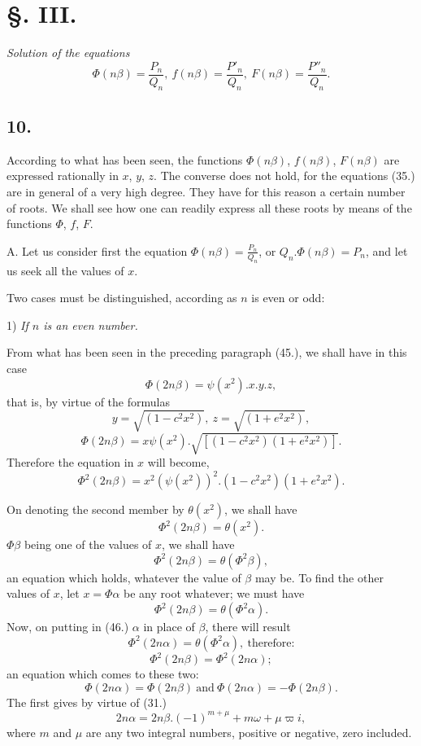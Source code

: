 \documentclass{article}
\begin{document}
\section*{§. III.}

\emph{Solution of the equations}
\[ \Phi(n\beta)=\frac{P_n}{Q_n},\ f(n\beta)=\frac{P'_n}{Q_n},\ F(n\beta)=\frac{P''_n}{Q_n}. \]

\subsection*{10.}

According to what has been seen, the functions $\Phi(n\beta)$, $f(n\beta)$, $F(n\beta)$ are expressed rationally in $x$, $y$, $z$. The converse does not hold, for the equations (35.) are in general of a very high degree. They have for this reason a certain number of roots. We shall see how one can readily express all these roots by means of the functions $\Phi$, $f$, $F$.

A. Let us consider first the equation $\Phi(n\beta)=\frac{P_n}{Q_n}$, or $Q_n.\Phi(n\beta)=P_n$, and let us seek all the values of $x$.

Two cases must be distinguished, according as $n$ is even or odd:

1) \emph{If $n$ is an even number.}

From what has been seen in the preceding paragraph (45.), we shall have in this case
\[ \Phi(2n\beta)=\psi(x^{2}).x.y.z, \]
that is, by virtue of the formulas
\[ y=\sqrt{(1-c^{2}x^{2})},\ z=\sqrt{(1+e^{2}x^{2})}, \]
\[ \Phi(2n\beta)=x\psi(x^{2}).\sqrt{[(1-c^{2}x^{2})(1+e^{2}x^{2})]}. \]
Therefore the equation in $x$ will become,
\[ \Phi^{2}(2n\beta)=x^{2}(\psi(x^{2}))^{2}.(1-c^{2}x^{2})(1+e^{2}x^{2}). \]

On denoting the second member by $\theta(x^{2})$, we shall have
\[ \Phi^{2}(2n\beta)=\theta(x^{2}). \]
$\Phi\beta$ being one of the values of $x$, we shall have
\[ \Phi^{2}(2n\beta)=\theta(\Phi^{2}\beta), \tag{46.} \]
an equation which holds, whatever the value of $\beta$ may be. To find the other values of $x$, let $x=\Phi\alpha$ be any root whatever; we must have
\[ \Phi^{2}(2n\beta)=\theta(\Phi^{2}\alpha). \]
Now, on putting in (46.) $\alpha$ in place of $\beta$, there will result
\[ \Phi^{2}(2n\alpha)=\theta(\Phi^{2}\alpha),\ \text{therefore:} \]
\[ \Phi^{2}(2n\beta)=\Phi^{2}(2n\alpha); \tag{47.} \]
an equation which comes to these two:
\[ \Phi(2n\alpha)=\Phi(2n\beta)\ \text{and}\ \Phi(2n\alpha)=-\Phi(2n\beta). \]
The first gives by virtue of (31.)
\[ 2n\alpha=2n\beta.(-1)^{m+\mu}+m\omega+\mu\varpi i, \]
where $m$ and $\mu$ are any two integral numbers, positive or negative, zero included.
\end{document}
